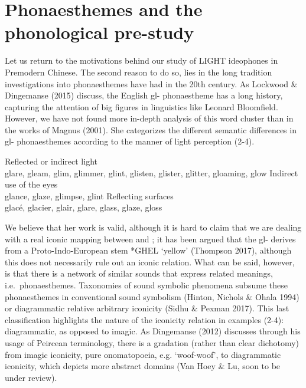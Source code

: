 \section{Phonaesthemes and the phonological
pre-study}\label{phonaesthemes-and-the-phonological-pre-study}

Let us return to the motivations behind our study of LIGHT ideophones in
Premodern Chinese. The second reason to do so, lies in the long
tradition investigations into phonaesthemes have had in the 20th
century. As Lockwood \& Dingemanse (2015) discuss, the English gl-
phonaestheme has a long history, capturing the attention of big figures
in linguistics like Leonard Bloomfield. However, we have not found more
in-depth analysis of this word cluster than in the works of Magnus
(2001). She categorizes the different semantic differences in gl-
phonaesthemes according to the manner of light perception (2-4).

\begin{exe}
    \ex \begin{xlist}
        \ex Reflected or indirect light\\
            glare, gleam, glim, glimmer, glint, glisten, glister,               glitter, gloaming, glow
        \ex Indirect use of the eyes\\
            glance, glaze, glimpse, glint
        \ex Reflecting surfaces\\
            glacé, glacier, glair, glare, glass, glaze, gloss
        \end{xlist}
\end{exe}

We believe that her work is valid, although it is hard to claim that we
are dealing with a real iconic mapping between and ; it has been argued
that the gl- derives from a Proto-Indo-European stem *GHEL `yellow'
(Thompson 2017), although this does not necessarily rule out an iconic
relation. What can be said, however, is that there is a network of
similar sounds that express related meanings, i.e.~phonaesthemes.
Taxonomies of sound symbolic phenomena subsume these phonaesthemes in
conventional sound symbolism (Hinton, Nichols \& Ohala 1994) or
diagrammatic relative arbitrary iconicity (Sidhu \& Pexman 2017). This
last classification highlights the nature of the iconicity relation in
examples (2-4): diagrammatic, as opposed to imagic. As Dingemanse (2012)
discusses through his usage of Peircean terminology, there is a
gradation (rather than clear dichotomy) from imagic iconicity, pure
onomatopoeia, e.g. `woof-woof', to diagrammatic iconicity, which depicts
more abstract domains (Van Hoey \& Lu, soon to be under review).

